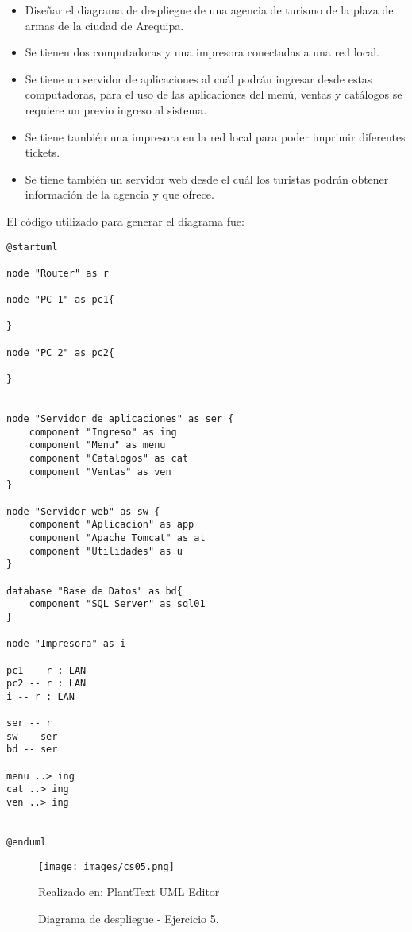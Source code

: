 \documentclass[a4paper,12pt]{article}
\begin{document}
\begin{itemize}
    \item Diseñar el diagrama de despliegue de una agencia de turismo de la plaza de armas de la ciudad de Arequipa.
    \item Se tienen dos computadoras y una impresora conectadas a una red local.
    \item Se tiene un servidor de aplicaciones al cuál podrán ingresar desde estas computadoras, para el uso de las aplicaciones del menú, ventas y catálogos se requiere un previo ingreso al sistema.
    \item Se tiene también una impresora en la red local para poder imprimir diferentes tickets.
    \item Se tiene también un servidor web desde el cuál los turistas podrán obtener información de la agencia y que ofrece.
    
\end{itemize}

\clearpage
\newpage

El código utilizado para generar el diagrama fue:

\begin{lstlisting}
@startuml

node "Router" as r

node "PC 1" as pc1{

}

node "PC 2" as pc2{

}


node "Servidor de aplicaciones" as ser {
    component "Ingreso" as ing
    component "Menu" as menu
    component "Catalogos" as cat
    component "Ventas" as ven
}

node "Servidor web" as sw {
    component "Aplicacion" as app
    component "Apache Tomcat" as at
    component "Utilidades" as u
}

database "Base de Datos" as bd{
    component "SQL Server" as sql01
}

node "Impresora" as i

pc1 -- r : LAN
pc2 -- r : LAN
i -- r : LAN

ser -- r
sw -- ser
bd -- ser

menu ..> ing
cat ..> ing
ven ..> ing


@enduml
\end{lstlisting}

\begin{figure}[ht]
        \centering        
        \texttt{[image: images/cs05.png]}
        \caption{Diagrama de despliegue - Ejercicio 5.}  
        {{\footnotesize Realizado en: PlantText UML Editor }}
\end{figure}

\clearpage
\newpage





    
\end{document}

